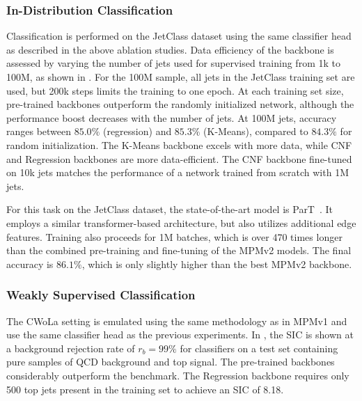 \subsubsection{In-Distribution Classification}

Classification is performed on the JetClass dataset using the same classifier head as described in the above ablation studies.
Data efficiency of the backbone is assessed by varying the number of jets used for supervised training from 1k to 100M, as shown in .
For the 100M sample, all jets in the JetClass training set are used, but 200k steps limits the training to one epoch.
At each training set size, pre-trained backbones outperform the randomly initialized network, although the performance boost decreases with the number of jets.
At 100M jets, accuracy ranges between $85.0\%$ (regression) and $85.3\%$ (K-Means), compared to $84.3\%$ for random initialization.
The K-Means backbone excels with more data, while CNF and Regression backbones are more data-efficient.
The CNF backbone fine-tuned on 10k jets matches the performance of a network trained from scratch with 1M jets.

For this task on the JetClass dataset, the state-of-the-art model is ParT~\cite{ParticleTransformerJet}.
It employs a similar transformer-based architecture, but also utilizes additional edge features.
Training also proceeds for 1M batches, which is over 470 times longer than the combined pre-training and fine-tuning of the MPMv2 models.
The final accuracy is $86.1\%$, which is only slightly higher than the best MPMv2 backbone.

\subsubsection{Weakly Supervised Classification}

The CWoLa setting is emulated using the same methodology as in MPMv1 and use the same classifier head as the previous experiments.
In , the SIC is shown at a background rejection rate of $r_b=99\%$ for classifiers on a test set containing pure samples of QCD background and top signal.
The pre-trained backbones considerably outperform the benchmark.
The Regression backbone requires only 500 top jets present in the training set to achieve an SIC of 8.18.

